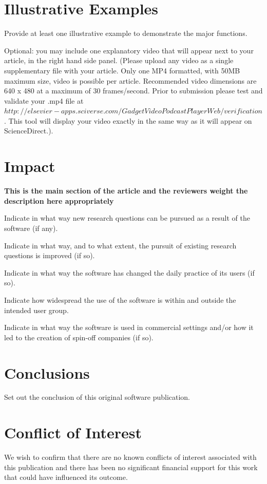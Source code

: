 \documentclass[12pt, a4paper,preprint,review]{elsarticle}
\begin{document}
\section{Illustrative Examples}
\label{}

Provide at least one illustrative example to demonstrate the major functions.

Optional: you may include one explanatory video that will appear next to your article, in the right hand side panel. (Please upload any video as a single supplementary file with your article. Only one MP4 formatted, with 50MB maximum size, video is possible per article. Recommended video dimensions are 640 x 480 at a maximum of 30 frames/second. Prior to submission please test and validate your .mp4 file at $ http://elsevier-apps.sciverse.com/GadgetVideoPodcastPlayerWeb/verification$. This tool will display your video exactly in the same way as it will appear on ScienceDirect.).

\section{Impact}
\label{}

\textbf{This is the main section of the article and the reviewers weight the description here appropriately}

Indicate in what way new research questions can be pursued as a result of the software (if any).

Indicate in what way, and to what extent, the pursuit of existing research questions is improved (if so).

Indicate in what way the software has changed the daily practice of its users (if so).

Indicate how widespread the use of the software is within and outside the intended user group.

Indicate in what way the software is used in commercial settings and/or how it led to the creation of spin-off companies (if so).

\section{Conclusions}
\label{}

Set out the conclusion of this original software publication.

\section{Conflict of Interest}
We wish to confirm that there are no known conflicts of interest associated with this publication and there has been no significant financial support for this work that could have influenced its outcome.
\end{document}
